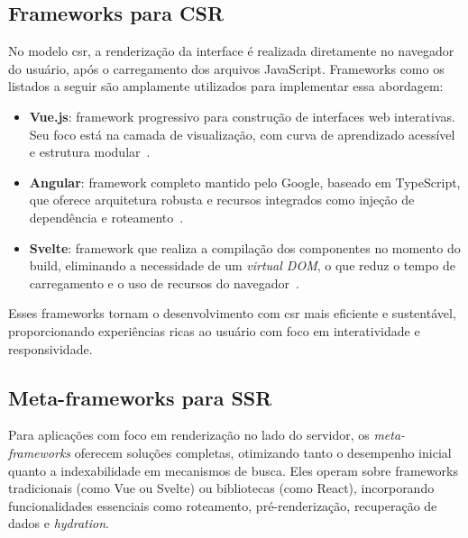 \subsection{Frameworks para CSR}
\label{subsec:frameworks-csr}

No modelo \acrshort{csr}, a renderização da interface é realizada diretamente no navegador do usuário, após o carregamento dos arquivos JavaScript. Frameworks como os listados a seguir são amplamente utilizados para implementar essa abordagem:

\begin{itemize}
    \item \textbf{Vue.js}: framework progressivo para construção de interfaces web interativas. Seu foco está na camada de visualização, com curva de aprendizado acessível e estrutura modular~\cite{vue2025}.
    
    \item \textbf{Angular}: framework completo mantido pelo Google, baseado em TypeScript, que oferece arquitetura robusta e recursos integrados como injeção de dependência e roteamento~\cite{angular2025}.
    
    \item \textbf{Svelte}: framework que realiza a compilação dos componentes no momento do build, eliminando a necessidade de um \textit{virtual DOM}, o que reduz o tempo de carregamento e o uso de recursos do navegador~\cite{svelte2025}.
\end{itemize}

Esses frameworks tornam o desenvolvimento com \acrshort{csr} mais eficiente e sustentável, proporcionando experiências ricas ao usuário com foco em interatividade e responsividade.

\subsection{Meta-frameworks para SSR}
\label{subsec:frameworks-ssr}

Para aplicações com foco em renderização no lado do servidor, os \emph{meta-frameworks} oferecem soluções completas, otimizando tanto o desempenho inicial quanto a indexabilidade em mecanismos de busca. Eles operam sobre frameworks tradicionais (como Vue ou Svelte) ou bibliotecas (como React), incorporando funcionalidades essenciais como roteamento, pré-renderização, recuperação de dados e \textit{hydration}.

